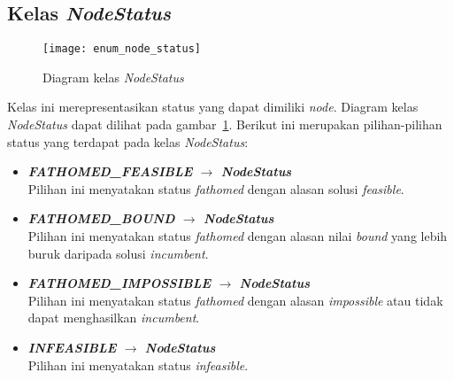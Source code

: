\subsection{Kelas \textit{NodeStatus}}
\begin{figure}[H]
	\centering  
	\texttt{[image: enum\_node\_status]}
	\caption[Diagram kelas \textit{NodeStatus}]{Diagram kelas \textit{NodeStatus}}
	\label{fig:enum_node_status}
\end{figure}
Kelas ini merepresentasikan status yang dapat dimiliki \textit{node}. Diagram kelas \textit{NodeStatus} dapat dilihat pada gambar~\ref{fig:enum_node_status}. Berikut ini merupakan pilihan-pilihan status yang terdapat pada kelas \textit{NodeStatus}:
\begin{itemize}
	\item \textbf{\textit{FATHOMED\_FEASIBLE} $\rightarrow$ \textit{NodeStatus}}\\
	Pilihan ini menyatakan status \textit{fathomed} dengan alasan solusi \textit{feasible}.
	\item \textbf{\textit{FATHOMED\_BOUND} $\rightarrow$ \textit{NodeStatus}}\\
	Pilihan ini menyatakan status \textit{fathomed} dengan alasan nilai \textit{bound} yang lebih buruk daripada solusi \textit{incumbent}.
	\item \textbf{\textit{FATHOMED\_IMPOSSIBLE} $\rightarrow$ \textit{NodeStatus}}\\
	Pilihan ini menyatakan status \textit{fathomed} dengan alasan \textit{impossible} atau tidak dapat menghasilkan \textit{incumbent}.
	\item \textbf{\textit{INFEASIBLE} $\rightarrow$ \textit{NodeStatus}}\\
	Pilihan ini menyatakan status \textit{infeasible}.
\end{itemize}

